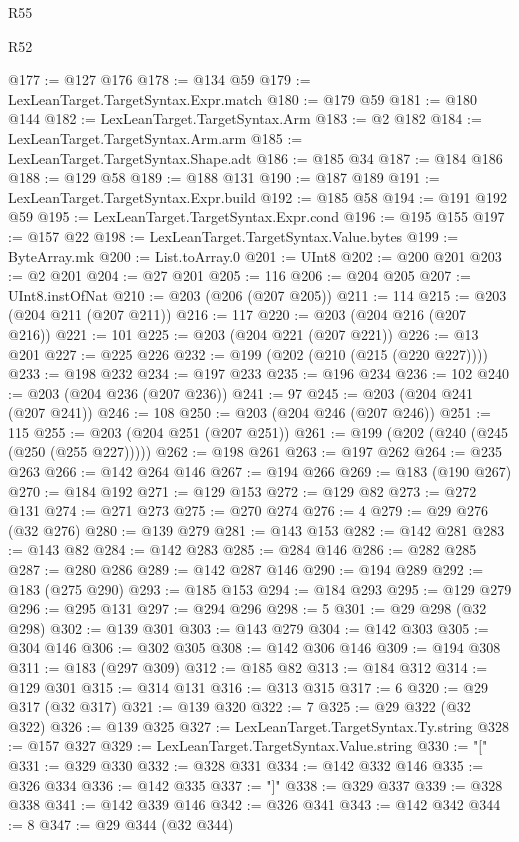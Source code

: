 \begin{lexlean}{R55}
\begin{lexlean}{R52}
\begin{coremodule}
{{{{{{{{{{{{{{{{{{{{{{{{{{{{{{{{{{{{{{{{{{{{{{{{{{{{{{{{{{{{{{{{{{{{{{{{{{{{{{{{{{{{{{{{{{{{{{{{{{{{{{{{{{{{{{{{{{{{{{{{{{{{{{{{{{{{{{{{{{{{{{{{{{{{{{{{{{{{{{{{{{{{{{{{{{{{{{{{{{{{{{{{{{{{{{{{{{{{{{@177 := @127 @176
@178 := @134 @59
@179 := LexLeanTarget.TargetSyntax.Expr.match
@180 := @179 @59
@181 := @180 @144
@182 := LexLeanTarget.TargetSyntax.Arm
@183 := @2 @182
@184 := LexLeanTarget.TargetSyntax.Arm.arm
@185 := LexLeanTarget.TargetSyntax.Shape.adt
@186 := @185 @34
@187 := @184 @186
@188 := @129 @58
@189 := @188 @131
@190 := @187 @189
@191 := LexLeanTarget.TargetSyntax.Expr.build
@192 := @185 @58
@194 := @191 @192 @59
@195 := LexLeanTarget.TargetSyntax.Expr.cond
@196 := @195 @155
@197 := @157 @22
@198 := LexLeanTarget.TargetSyntax.Value.bytes
@199 := ByteArray.mk
@200 := List.toArray.{0}
@201 := UInt8
@202 := @200 @201
@203 := @2 @201
@204 := @27 @201
@205 := 116
@206 := @204 @205
@207 := UInt8.instOfNat
@210 := @203 (@206 (@207 @205))
@211 := 114
@215 := @203 (@204 @211 (@207 @211))
@216 := 117
@220 := @203 (@204 @216 (@207 @216))
@221 := 101
@225 := @203 (@204 @221 (@207 @221))
@226 := @13 @201
@227 := @225 @226
@232 := @199 (@202 (@210 (@215 (@220 @227))))
@233 := @198 @232
@234 := @197 @233
@235 := @196 @234
@236 := 102
@240 := @203 (@204 @236 (@207 @236))
@241 := 97
@245 := @203 (@204 @241 (@207 @241))
@246 := 108
@250 := @203 (@204 @246 (@207 @246))
@251 := 115
@255 := @203 (@204 @251 (@207 @251))
@261 := @199 (@202 (@240 (@245 (@250 (@255 @227)))))
@262 := @198 @261
@263 := @197 @262
@264 := @235 @263
@266 := @142 @264 @146
@267 := @194 @266
@269 := @183 (@190 @267)
@270 := @184 @192
@271 := @129 @153
@272 := @129 @82
@273 := @272 @131
@274 := @271 @273
@275 := @270 @274
@276 := 4
@279 := @29 @276 (@32 @276)
@280 := @139 @279
@281 := @143 @153
@282 := @142 @281
@283 := @143 @82
@284 := @142 @283
@285 := @284 @146
@286 := @282 @285
@287 := @280 @286
@289 := @142 @287 @146
@290 := @194 @289
@292 := @183 (@275 @290)
@293 := @185 @153
@294 := @184 @293
@295 := @129 @279
@296 := @295 @131
@297 := @294 @296
@298 := 5
@301 := @29 @298 (@32 @298)
@302 := @139 @301
@303 := @143 @279
@304 := @142 @303
@305 := @304 @146
@306 := @302 @305
@308 := @142 @306 @146
@309 := @194 @308
@311 := @183 (@297 @309)
@312 := @185 @82
@313 := @184 @312
@314 := @129 @301
@315 := @314 @131
@316 := @313 @315
@317 := 6
@320 := @29 @317 (@32 @317)
@321 := @139 @320
@322 := 7
@325 := @29 @322 (@32 @322)
@326 := @139 @325
@327 := LexLeanTarget.TargetSyntax.Ty.string
@328 := @157 @327
@329 := LexLeanTarget.TargetSyntax.Value.string
@330 := "["
@331 := @329 @330
@332 := @328 @331
@334 := @142 @332 @146
@335 := @326 @334
@336 := @142 @335
@337 := "]"
@338 := @329 @337
@339 := @328 @338
@341 := @142 @339 @146
@342 := @326 @341
@343 := @142 @342
@344 := 8
@347 := @29 @344 (@32 @344)
}}}}}}}}}}}}}}}}}}}}}}}}}}}}}}}}}}}}}}}}}}}}}}}}}}}}}}}}}}}}}}}}}}}}}}}}}}}}}}}}}}}}}}}}}}}}}}}}}}}}}}}}}}}}}}}}}}}}}}}}}}}}}}}}}}}}}}}}}}}}}}}}}}}}}}}}}}}}}}}}}}}}}}}}}}}}}}}}}}}}}}}}}}}}}}}}}}}}}}
\end{coremodule}
\end{lexlean}
\end{lexlean}

